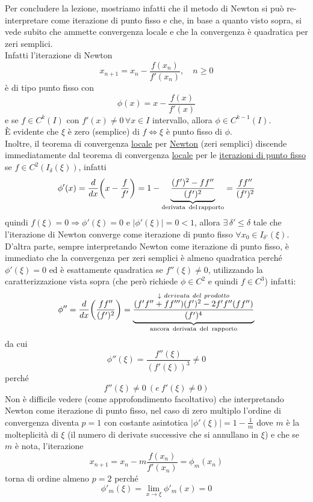 \documentclass[12pt]{article}
\begin{document}
\bigskip
Per concludere la lezione, mostriamo infatti che il metodo di Newton si può re-interpretare come iterazione di punto fisso e che, in base a quanto visto sopra, si vede subito che ammette convergenza locale e che la convergenza è quadratica per zeri semplici.\\
Infatti l'iterazione di Newton
\[x_{n+1} = x_n - \frac{f(x_n)}{f'(x_n)}, \quad n\ge 0\]
è di tipo punto fisso con
\[\phi(x) = x - \frac{f(x)}{f'(x)}\]
e se $f \in C^k(I)$ con $f'(x)\ne 0 \,\forall x \in I$ intervallo, allora $\phi \in C^{k-1}(I)$.\\
È evidente che $\xi$ è zero (semplice) di $f \iff \xi$ è punto fisso di $\phi$.\\
Inoltre, il teorema di convergenza \underline{locale} per \underline{Newton} (zeri semplici) discende immediatamente dal teorema di convergenza \underline{locale} per le \underline{iterazioni di punto fisso} se $f \in C^2(I_\delta(\xi))$, infatti
\[ \phi'(x) = \frac{d}{dx}\biggl(x-\frac{f}{f'}\biggr) = 1 - \underbrace{\frac{(f')^2 - ff''}{(f')^2}}_{\text{derivata\, del\,rapporto}} = \frac{ff''}{(f')^2}\]
quindi $f(\xi)=0 \Rightarrow \phi'(\xi)=0$ e $|\phi'(\xi)|=0<1$, allora $\exists\, \delta'\le \delta$ tale che l'iterazione di Newton converge come iterazione di punto fisso $\forall x_0 \in I_{\delta'}(\xi)$.\\
D'altra parte, sempre interpretando Newton come iterazione di punto fisso, è immediato che la convergenza per zeri semplici è almeno quadratica perché $\phi'(\xi)=0$ ed è esattamente quadratica se $f''(\xi)\neq0$, utilizzando la caratterizzazione vista sopra (che però richiede $\phi \in C^2$ e quindi $f\in C^3$) infatti:
\begin{equation*}
    \phi''=\frac{d}{dx}\biggl(\frac{f f''}{(f')^2}\biggr)= 
    \underbrace{\frac{\overset{ \downarrow \ derivata \ del \ prodotto}{(f' f''+f f''')(f')^2-2 f' f'' (f f'')}}{(f')^4}}_{\text{ancora\, derivata\, del\, rapporto}}
\end{equation*}
da cui 
\begin{equation*}
    \phi''(\xi)=\frac{f''(\xi)}{(f'(\xi))^3}\neq 0
\end{equation*}
perché 
\begin{equation*}
    f''(\xi)\neq 0 \ ( e \ f'(\xi)\neq0)
\end{equation*}
Non è difficile vedere (come approfondimento facoltativo) che interpretando Newton come iterazione di punto fisso, nel caso di zero multiplo l'ordine di convergenza diventa $p=1$ con costante asintotica $|\phi'(\xi)|=1-\frac{1}{m}$ dove $m$ è la molteplicità di $\xi$ (il numero di derivate successive che si annullano in $\xi$) e che se $m$ è nota, l'iterazione
\[x_{n+1}=x_n-m\frac{f(x_n)}{f'(x_n)}=\phi_m(x_n)\]
torna di ordine almeno $p=2$ perché 
\[\phi'_m(\xi)=\lim\limits_{x\to\xi}\phi'_m(x)=0\]
\end{document}

